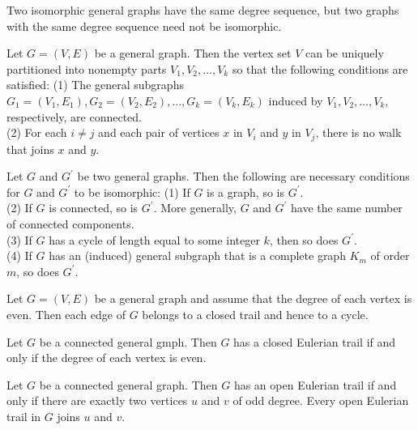 \begin{theorem}
  \label{thm:11.1.2}
  Two isomorphic general graphs have the same degree sequence, but two graphs with the same degree 
  sequence need not be isomorphic.
\end{theorem}

\begin{theorem}
  \label{thm:11.1.3}
  Let $G=(V, E)$ be a general graph. Then the vertex set $V$ can be uniquely partitioned into 
  nonempty parts $V_1, V_2, \ldots, V_k$ so that the following conditions are satisfied:
  (1) The general subgraphs $G_1=\left(V_1, E_1\right), G_2=\left(V_2, E_2\right), \ldots, G_k=
  \left(V_k, E_k\right)$ induced by $V_1, V_2, \ldots, V_k$, respectively, are connected.\\
  (2) For each $i \neq j$ and each pair of vertices $x$ in $V_i$ and $y$ in $V_j$, there is no walk 
  that joins $x$ and $y$.
\end{theorem}

\begin{theorem}
  \label{thm:11.1.4}
  Let $G$ and $G^{\prime}$ be two general graphs. Then the following are necessary conditions for 
  $G$ and $G^{\prime}$ to be isomorphic:
  (1) If $G$ is a graph, so is $G^{\prime}$.\\
  (2) If $G$ is connected, so is $G^{\prime}$. More generally, $G$ and $G^{\prime}$ have the same 
  number of connected components.\\
  (3) If $G$ has a cycle of length equal to some integer $k$, then so does $G^{\prime}$.\\
  (4) If $G$ has an (induced) general subgraph that is a complete graph $K_m$ of order $m$, so does
  $G^{\prime}$.
\end{theorem}

\begin{theorem}
  \label{thm:11.2.1}
  Let $G = (V, E)$ be a general graph and assume that the degree of each vertex is even. Then each 
  edge of $G$ belongs to a closed trail and hence to a cycle.
\end{theorem}

\begin{theorem}
  \label{thm:11.2.2}
  Let $G$ be a connected general gmph. Then $G$ has a closed Eulerian trail if and only if the 
  degree of each vertex is even.
\end{theorem}

\begin{theorem}
  \label{thm:11.2.3}
  Let $G$ be a connected general graph. Then $G$ has an open Eulerian trail if and only if there are
  exactly two vertices $u$ and $v$ of odd degree. Every open Eulerian trail in $G$ joins $u$ and $v$.
\end{theorem}

